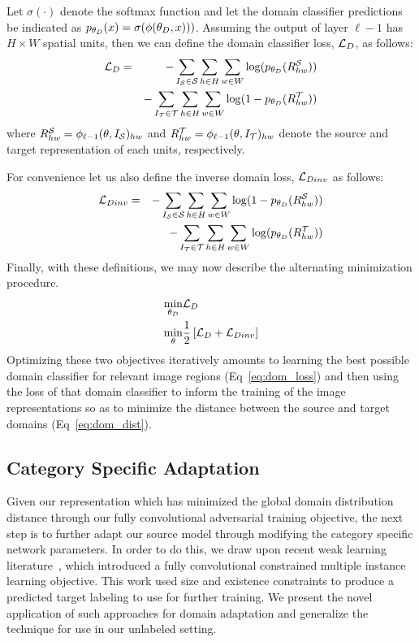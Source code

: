 \documentclass[10pt,twocolumn,letterpaper]{article}
\begin{document}
Let $\sigma(\cdot)$ denote the softmax function and let the domain classifier predictions be indicated as $p_{\theta_D}(x) = \sigma(\phi(\theta_D, x)))$. Assuming the output of layer $\ell-1$ has $H\times W$ spatial units, then we can define the domain classifier loss, $\mathcal{L}_D$, as follows:
\begin{eqnarray}
\mathcal{L}_D &=& -\sum_{{I}_{\mathcal{S}} \in \mathcal{S}} \sum_{h \in H} \sum_{w \in W} \log(p_{\theta_D}(R^{\mathcal{S}}_{hw})) \\
			&& - \sum_{{I}_{\mathcal{T}} \in \mathcal{T}} \sum_{h \in H} \sum_{w\in W} \log(1-p_{\theta_D}(R^{\mathcal{T}}_{hw}))
\end{eqnarray}
where $R^{\mathcal{S}}_{hw} = \phi_{\ell-1}(\theta, {I}_{\mathcal{S}})_{hw}$ and $R^{\mathcal{T}}_{hw} = \phi_{\ell-1}(\theta, {I}_{\mathcal{T}})_{hw}$ denote the source and target representation of each units, respectively.

For convenience let us also define the inverse domain loss, $\mathcal{L}_{Dinv}$ as follows:
\begin{eqnarray}
	\mathcal{L}_{Dinv} &=& - \sum_{{I}_{\mathcal{S}} \in \mathcal{S}} \sum_{h \in H} \sum_{w \in W} \log(1-p_{\theta_D}(R^{\mathcal{S}}_{hw})) \\
			&& - \sum_{{I}_{\mathcal{T}} \in \mathcal{T}} \sum_{h \in H} \sum_{w\in W} \log(p_{\theta_D}(R^{\mathcal{T}}_{hw}))
\end{eqnarray}
Finally, with these definitions, we may now describe the alternating minimization procedure.
\begin{eqnarray}
	\min_{\theta_D} & \mathcal{L}_D \label{eq:dom_loss} \\
	\min_{\theta} & \frac{1}{2} \left[\mathcal{L}_D + \mathcal{L}_{Dinv} \right] \label{eq:dom_dist}
\end{eqnarray}
Optimizing these two objectives iteratively amounts to learning the best possible domain classifier for relevant image regions (Eq~\eqref{eq:dom_loss}) and then using the loss of that domain classifier to inform the training of the image representations so as to minimize the distance between the source and target domains (Eq~\eqref{eq:dom_dist}).











\subsection{Category Specific Adaptation}\label{sec:category}

Given our representation which has minimized the global domain distribution distance through our fully convolutional adversarial training objective, the next step is to further adapt our source model through modifying the category specific network parameters. In order to do this, we draw upon recent weak learning literature~\cite{pathak2015constrained,pathak2015fully}, which introduced a fully convolutional constrained multiple instance learning objective. This work used size and existence constraints to produce a predicted target labeling to use for further training. We present the novel application of such approaches for domain adaptation and generalize the technique for use in our unlabeled setting. 
\end{document}
